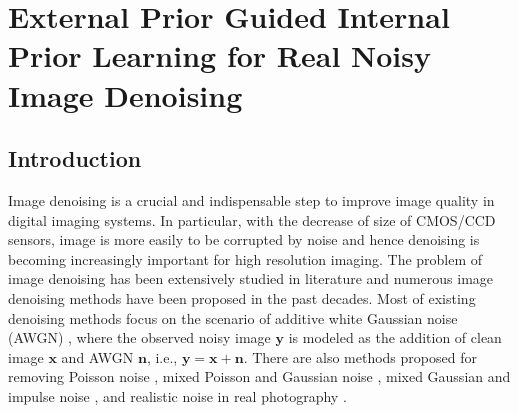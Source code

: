%
\chapter{External Prior Guided Internal Prior Learning for Real Noisy Image Denoising}
\label{sec:guided}

\section{Introduction}
\label{sec:system:intro}

Image denoising is a crucial and indispensable step to improve image quality in digital imaging systems. In particular, with the decrease of size of CMOS/CCD sensors, image is more easily to be corrupted by noise and hence denoising is becoming increasingly important for high resolution imaging. The problem of image denoising has been extensively studied in literature and numerous image denoising methods
\cite{bayesshrink,curvelet,ksvd,lssc,ncsr,bm3d,cbm3d,
zhou2012nonparametric,Tomasi1998,blsgsm,nlm,nlbayes,wnnm,pgpd,combexin,external,
tid,foe,epll,
mlp,xie2012image,dncnn,
barbu2009training,csf,tnrd,Fadili,salmon2014,
Foipractical,Luisier,makitalo2013optimal,Montagner,
jiang2014mixed,Hu2016,xuaccv2016,
fullyblind,rabie2005robust,Liu2008,almapg,noiseclinic,
ncwebsite,Zhu_2016_CVPR,crosschannel2016,neatimage}
have been proposed in the past decades. Most of existing denoising methods focus on the scenario of additive white Gaussian noise (AWGN) 
\cite{bayesshrink,curvelet,ksvd,lssc,ncsr,bm3d,cbm3d,
zhou2012nonparametric,Tomasi1998,blsgsm,nlm,nlbayes,wnnm,pgpd,foe,epll,
mlp,xie2012image,dncnn,barbu2009training,csf,tnrd}, where the observed noisy image $\mathbf{y}$ is modeled as the addition of clean image $\mathbf{x}$ and AWGN $\mathbf{n}$, i.e., $\mathbf{y}=\mathbf{x}+\mathbf{n}$. There are also methods proposed for removing Poisson noise \cite{Fadili,salmon2014}, mixed Poisson and Gaussian noise \cite{Foipractical,Luisier,makitalo2013optimal,Montagner}, mixed Gaussian and impulse noise \cite{jiang2014mixed,Hu2016,xuaccv2016}, and realistic noise in real photography \cite{fullyblind,rabie2005robust,Liu2008,almapg,Zhu_2016_CVPR,noiseclinic,
ncwebsite,crosschannel2016,neatimage}.

